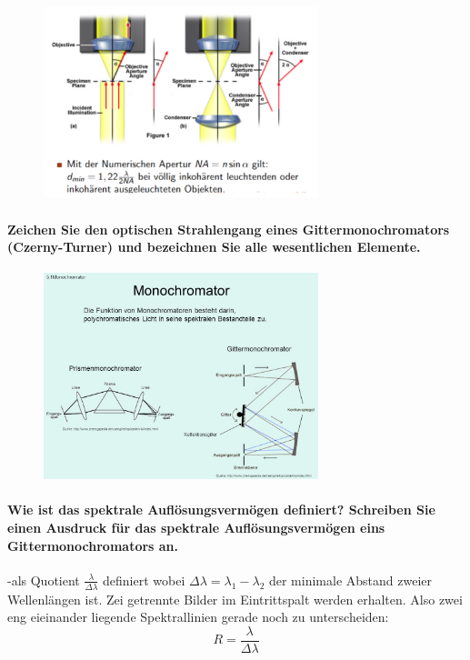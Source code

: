 \documentclass[a4paper, 11pt, parskip=half]{scrartcl}
\begin{document}
\begin{figure}[H]
    \centering
    \includegraphics[width=8cm]{image/22/opt25}
\end{figure}

\paragraph{Zeichen Sie den optischen Strahlengang eines Gittermonochromators (Czerny-Turner) und
bezeichnen Sie alle wesentlichen Elemente.}

\begin{figure}[H]
    \centering
    \includegraphics[width=8cm]{image/22/opt26}
\end{figure}

\paragraph{Wie ist das spektrale Auflösungsvermögen definiert? Schreiben Sie einen Ausdruck für das
spektrale Auflösungsvermögen eins Gittermonochromators an.}

-als Quotient $\frac{\lambda}{\Delta \lambda}$ definiert wobei $\Delta \lambda = \lambda_1 - \lambda_2$ der minimale Abstand zweier Wellenlängen ist. Zei getrennte Bilder im Eintrittspalt werden erhalten. Also zwei eng eieinander liegende Spektrallinien gerade noch zu unterscheiden:
\begin{equation}
R = \frac{\lambda}{\Delta \lambda}
\end{equation}
\end{document}
